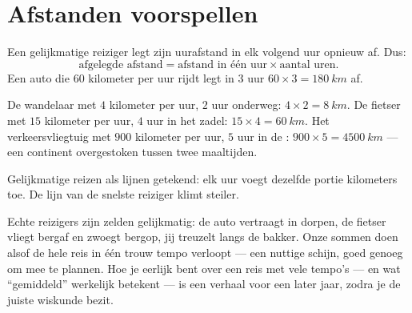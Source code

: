 \section{Afstanden voorspellen}

\begin{proposition}\label{prop:g5:speed-distance-time:distance}
Een gelijkmatige reiziger legt zijn uurafstand in elk volgend uur
opnieuw af. Dus:
\[
\text{afgelegde afstand} = \text{afstand in één uur} \times
\text{aantal uren}.
\]
Een auto die $60$ kilometer per uur rijdt legt in $3$ uur
$60 \times 3 = \qty{180}{km}$ af.
\end{proposition}

\begin{example}[Reissommen]\label{ex:g5:speed-distance-time:journeys}
De wandelaar met $4$ kilometer per uur, $2$ uur onderweg:
$4 \times 2 = \qty{8}{km}$. De fietser met $15$ kilometer per uur, $4$
uur in het zadel: $15 \times 4 = \qty{60}{km}$. Het
verkeersvliegtuig met $900$ kilometer per uur, $5$ uur in de :
$900 \times 5 = \qty{4500}{km}$ --- een continent overgestoken tussen
twee maaltijden.
\end{example}

\begin{omfigure}

{\small Gelijkmatige reizen als lijnen getekend: elk uur voegt dezelfde
portie kilometers toe. De lijn van de snelste reiziger klimt steiler.}
\end{omfigure}

\begin{remark}\label{rem:g5:speed-distance-time:steady}
Echte reizigers zijn zelden gelijkmatig: de auto vertraagt in dorpen,
de fietser vliegt bergaf en zwoegt bergop, jij treuzelt langs de
bakker. Onze sommen doen alsof de hele reis in één trouw tempo
verloopt --- een nuttige schijn, goed genoeg om mee te plannen. Hoe je
eerlijk bent over een reis met vele tempo's --- en wat ``gemiddeld''
werkelijk betekent --- is een verhaal voor een later jaar, zodra je de
juiste wiskunde bezit.
\end{remark}


